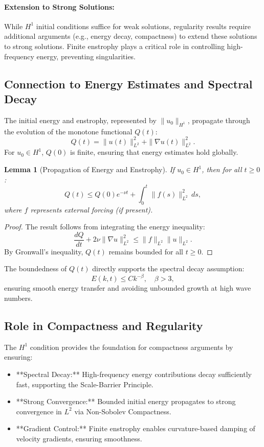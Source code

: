 \documentclass[12pt]{article}
\newtheorem{lemma}[theorem]{Lemma}
\theoremstyle{definition}
\begin{document}
\paragraph{Extension to Strong Solutions:}
While $H^1$ initial conditions suffice for weak solutions, regularity results require additional arguments (e.g., energy decay, compactness) to extend these solutions to strong solutions. Finite enstrophy plays a critical role in controlling high-frequency energy, preventing singularities.

\subsection{Connection to Energy Estimates and Spectral Decay}
The initial energy and enstrophy, represented by $\|u_0\|_{H^1}$, propagate through the evolution of the monotone functional $Q(t)$:
\begin{equation}
Q(t) = \|u(t)\|_{L^2}^2 + \|\nabla u(t)\|_{L^2}^2.
\end{equation}
For $u_0 \in H^1$, $Q(0)$ is finite, ensuring that energy estimates hold globally.

\begin{lemma}[Propagation of Energy and Enstrophy]
If $u_0 \in H^1$, then for all $t \geq 0$:
\begin{equation}
Q(t) \leq Q(0) e^{-\nu t} + \int_0^t \|f(s)\|_{L^2}^2 \, ds,
\end{equation}
where $f$ represents external forcing (if present).
\end{lemma}

\begin{proof}
The result follows from integrating the energy inequality:
\begin{equation}
\frac{dQ}{dt} + 2\nu \|\nabla u\|_{L^2}^2 \leq \|f\|_{L^2} \|u\|_{L^2}.
\end{equation}
By Gronwall’s inequality, $Q(t)$ remains bounded for all $t \geq 0$.
\end{proof}

The boundedness of $Q(t)$ directly supports the spectral decay assumption:
\begin{equation}
E(k, t) \leq C k^{-\beta}, \quad \beta > 3,
\end{equation}
ensuring smooth energy transfer and avoiding unbounded growth at high wave numbers.

\subsection{Role in Compactness and Regularity}
The $H^1$ condition provides the foundation for compactness arguments by ensuring:
\begin{itemize}
    \item **Spectral Decay:** High-frequency energy contributions decay sufficiently fast, supporting the Scale-Barrier Principle.
    \item **Strong Convergence:** Bounded initial energy propagates to strong convergence in $L^2$ via Non-Sobolev Compactness.
    \item **Gradient Control:** Finite enstrophy enables curvature-based damping of velocity gradients, ensuring smoothness.
\end{itemize}
\end{document}
